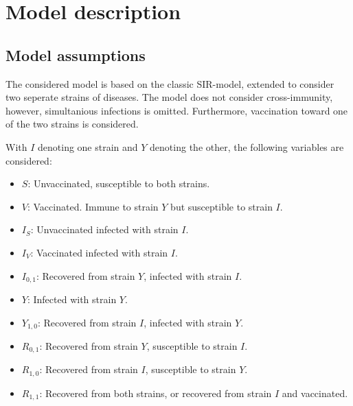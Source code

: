 \documentclass[10pt,a4paper]{article}
\author{Rasmus Kristoffer Pedersen}
\begin{document}
\section{Model description}
\subsection{Model assumptions}
The considered model is based on the classic SIR-model, extended to consider two seperate strains of diseases.
The model does not consider cross-immunity, however, simultanious infections is omitted. 
Furthermore, vaccination toward one of the two strains is considered. 

With $I$ denoting one strain and $Y$ denoting the other, the following variables are considered:
\begin{itemize} 
    \item $S$: Unvaccinated, susceptible to both strains.
    \item $V$: Vaccinated. Immune to strain $Y$ but susceptible to strain $I$.
    \item $I_S$: Unvaccinated infected with strain $I$.
    \item $I_V$: Vaccinated infected with strain $I$.
    \item $I_{0,1}$: Recovered from strain $Y$, infected with strain $I$.
    \item $Y$: Infected with strain $Y$. 
    \item $Y_{1,0}$: Recovered from strain $I$, infected with strain $Y$.
    \item $R_{0,1}$: Recovered from strain $Y$, susceptible to strain $I$.
    \item $R_{1,0}$: Recovered from strain $I$, susceptible to strain $Y$.
    \item $R_{1,1}$: Recovered from both strains, or recovered from strain $I$ and vaccinated.
\end{itemize}
\end{document}
